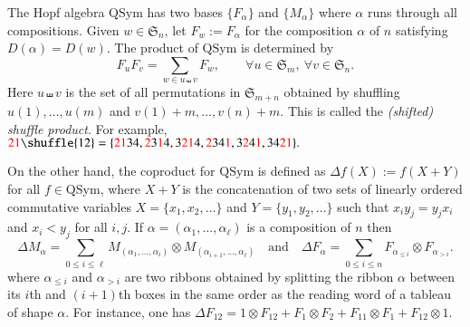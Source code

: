\documentclass{amsart}
\newtheorem*{Young's Rule}{Young's Rule}
\theoremstyle{definition}
\theoremstyle{remark}
\numberwithin{equation}{section}
\begin{document}
The Hopf algebra ${\mathrm{QSym}}$ has two bases $\{F_\alpha\}$ and $\{M_\alpha\}$ where $\alpha$ runs through all compositions. Given $w\in {{\mathfrak S}}_n$, let $F_w:=F_\alpha$ for the composition $\alpha$ of $n$ satisfying $D(\alpha)=D(w)$. The product of ${\mathrm{QSym}}$ is determined by 
\begin{equation}
F_uF_v=\sum_{w\in u\shuffle v} F_w, \qquad \forall u\in{{\mathfrak S}}_m,\ \forall v\in{{\mathfrak S}}_n.
\end{equation}
Here $u\shuffle v$ is the set of all permutations in ${{\mathfrak S}}_{m+n}$ obtained by shuffling $u(1),\ldots,u(m)$ and $v(1)+m,\ldots,v(n)+m$. This is called the \emph{(shifted) shuffle product}. For example, ${\color{red}21}\shuffle{12} = \{{\color{red}21}34, {{\color{red}2}3{\color{red}1}4}, {3{\color{red}21}4}, {{\color{red}2}34{\color{red}1}}, {3{\color{red}2}4{\color{red}1}}, {34{\color{red}21}} \}.$

On the other hand, the coproduct for ${\mathrm{QSym}}$ is defined as $\Delta f(X):=f(X+Y)$ for all $f\in{\mathrm{QSym}}$, where $X+Y$ is the concatenation of two sets of linearly ordered commutative variables $X=\{x_1,x_2,\ldots\}$ and $Y=\{y_1,y_2,\ldots\}$ such that $x_iy_j=y_jx_i$ and $x_i<y_j$ for all $i,j$. If $\alpha=(\alpha_1,\ldots,\alpha_\ell)$ is a composition of $n$ then
\[ \Delta M_\alpha = \sum_{0\le i\le \ell} M_{(\alpha_1,\ldots,\alpha_i)}\otimes M_{(\alpha_{i+1},\ldots,\alpha_\ell)} {\quad\text{and}\quad}
\Delta F_\alpha=\sum_{0\le i\le n} F_{\alpha_{\leq i}}\otimes F_{\alpha_{>i}}.\]
where $\alpha_{\le i}$ and $\alpha_{>i}$ are two ribbons obtained by splitting the ribbon $\alpha$ between its $i$th and $(i+1)$th boxes in the same order as the reading word of a tableau of shape $\alpha$. For instance, one has
$ \Delta F_{12} = 1\otimes F_{12}+ F_1 \otimes F_{2}+ F_{11} \otimes F_1 + F_{12} \otimes1. $
\end{document}
